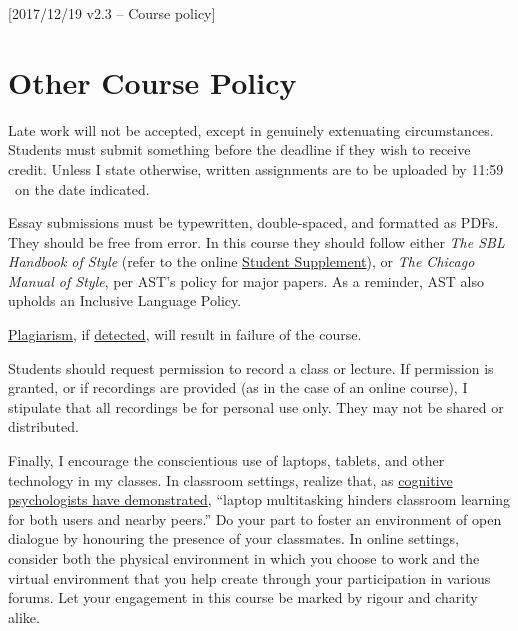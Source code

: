 [2017/12/19 v2.3 -- Course policy]

\section{Other Course Policy}
\label{policy}

Late work will not be accepted, except in genuinely extenuating
circumstances. Students must submit something before the deadline if
they wish to receive credit. Unless I state otherwise, written
assignments are to be uploaded by 11:59 \PM\ on the date indicated.

Essay submissions must be typewritten, double-spaced, and formatted as
PDFs. They should be free from error. In this course they should follow
either \emph{The SBL Handbook of Style} (refer to the online
\href{https://www.sbl-site.org/assets/pdfs/pubs/SBLHSsupp2015-02.pdf}{
Student Supplement}), or \emph{The Chicago Manual of Style}, per AST's
policy for major papers. As a reminder, AST also upholds an Inclusive
Language Policy.

\href{http://www.eerdmans.com/Pages/Item/59043/Commentary-Statement.aspx}{Plagiarism},
if \href{https://www.theguardian.com/world/2013/feb/09/german-education-minister-quits-phd-plagiarism}{detected},
will result in failure of the course.

Students should request permission to record a class or lecture. If
permission is granted, or if recordings are provided (as in the case of
an online course), I stipulate that all recordings be for personal use
only. They may not be shared or distributed.

Finally, I encourage the conscientious use of laptops, tablets, and
other technology in my classes. In classroom settings, realize that, as
\href{http://dx.doi.org/10.1016/j.compedu.2012.10.003}{cognitive
psychologists have demonstrated}, ``laptop multitasking hinders
classroom learning for both users and nearby peers.'' Do your part to
foster an environment of open dialogue by honouring the presence of your
classmates. In online settings, consider both the physical environment
in which you choose to work and the virtual environment that you help
create through your participation in various forums. Let your engagement
in this course be marked by rigour and charity alike.